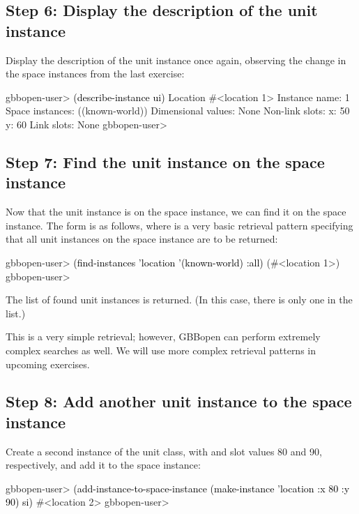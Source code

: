\documentclass[10pt,twoside,english,pdftex]{article}
\begin{document}
\subsection*{Step 6: Display the description of the unit instance}

%
Display the description of the  unit instance once
again, observing the change in the space instances from the last exercise:
%
\W\supp
\begin{example}
\textcolor{darkergray}{%
  gbbopen-user> \textcolor{black}{(describe-instance ui)}
  Location #<location 1>
    Instance name: 1
    Space instances: ((known-world))
    Dimensional values: None
    Non-link slots:
      x:  50
      y:  60
    Link slots: None
  gbbopen-user>}
\end{example}

\subsection*{Step 7: Find the unit instance on the space instance}

%
%
%
Now that the  unit instance is on the
 space instance, we can find it on the space
instance. The form is as follows, where  is a very basic retrieval
pattern specifying that all unit instances on the 
space instance are to be returned:
%
\W\supp
\begin{example}
\textcolor{darkergray}{%
  gbbopen-user> \textcolor{black}{(find-instances 'location '(known-world) :all)}
  (#<location 1>)
  gbbopen-user>}
\end{example}
%
The list of found unit instances is returned. (In this case, there is only one
in the list.)

This is a very simple retrieval; however, GBBopen can perform extremely
complex searches as well.  We will use more complex retrieval patterns in
upcoming exercises.

\subsection*{Step 8: Add another unit instance to the space instance}

%
%
Create a second instance of the  unit class, with
 and  slot values 80 and 90, respectively, and add it to the
 space instance:
%
\W\supp
\begin{example}
\textcolor{darkergray}{%
  gbbopen-user> \textcolor{black}{(add-instance-to-space-instance 
                   (make-instance 'location :x 80 :y 90)
                   si)}
  #<location 2>
  gbbopen-user>}
\end{example}
\end{document}
